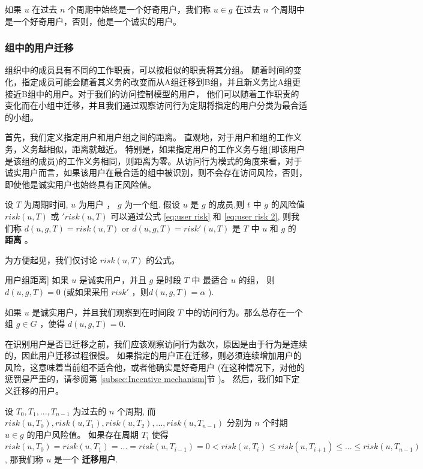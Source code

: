 如果 $u$ 在过去 $n$ 个周期中始终是一个好奇用户，我们称 $u \in g$ 在过去 $n$ 个周期中是一个好奇用户，否则，他是一个诚实的用户。

\subsubsection{组中的用户迁移}
组织中的成员具有不同的工作职责，可以按相似的职责将其分组。 随着时间的变化，指定成员可能会随着其义务的改变而从A组迁移到B组，并且新义务比A组更接近B组中的用户。对于我们的访问控制模型的用户， 他们可以随着工作职责的变化而在小组中迁移，并且我们通过观察访问行为定期将指定的用户分类为最合适的小组。

首先，我们定义指定用户和用户组之间的距离。 直观地，对于用户和组的工作义务，义务越相似，距离就越近。 特别是，如果指定用户的工作义务与组(即该用户是该组的成员)的工作义务相同，则距离为零。从访问行为模式的角度来看，对于诚实用户而言，如果该用户在最合适的组中被识别，则不会存在访问风险，否则，即使他是诚实用户也始终具有正风险值。

\begin{definition}%
	\label{user-group distance}
	设 $T$ 为周期时间, $u$ 为用户 ， $g$ 为一个组. 假设 $u$ 是 $g$ 的成员,则 $t$ 中 $g$ 的风险值 $risk(u,T)$ 或 $'risk(u,T)$ 可以通过公式 \ref{eq:user risk} 和 \ref{eq:user risk 2}, 则我们称 $d(u,g,T)=risk(u,T)$ or $d(u,g,T)=risk'(u,T)$ 是 $T$ 中 $u$ 和 $g$ 的 \textbf{距离} 。
\end{definition}

为方便起见，我们仅讨论 $risk(u,T)$ 的公式。

\begin{claim}用户组距离]
	如果 $u$ 是诚实用户，并且 $g$ 是时段 $T$ 中 最适合 $u$ 的组， 则 $d(u,g,T)=0$ (或如果采用 $risk'$ ，则$d(u,g,T)=\alpha$ ).
\end{claim}

\begin{claim}
	如果 $u$ 是诚实用户，并且我们观察到在时间段 $T$ 中的访问行为。那么总存在一个组 $g \in G$ ，使得 $d(u,g,T)=0$.
\end{claim}

在识别用户是否已迁移之前，我们应该观察访问行为数次，原因是由于行为是连续的，因此用户迁移过程很慢。 如果指定的用户正在迁移，则必须连续增加用户的风险，这意味着当前组不适合他，或者他确实是好奇用户 (在这种情况下，对他的惩罚是严重的，请参阅第 \ref{subsec:Incentive mechanism}节 )。 然后，我们如下定义迁移的用户。

\begin{definition}%
	\label{def:migrating user}
	设 $T_0,T_1,...,T_{n-1}$ 为过去的 $n$ 个周期, 而 $risk(u,T_0),risk(u,T_1),risk(u,T_2),..., risk(u,T_{n-1})$ 分别为 $n$ 个时期 $u\in g$ 的用户风险值。 如果存在周期 $T_i$ 使得 $risk(u,T_0) = risk(u,T_1) = ... = risk(u,T_{i-1}) =0  < risk(u,T_{i}) \leq risk(u,T_{i+1}) \leq ... \leq risk(u,T_{n-1})$, 那我们称 $u$ 是一个 \textbf{迁移用户}.
\end{definition}


